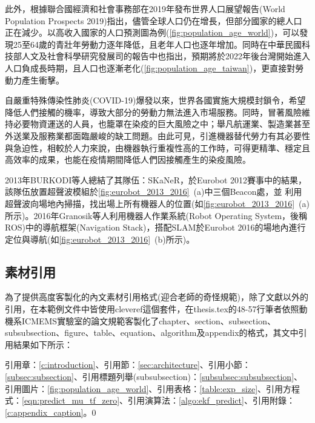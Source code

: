 此外，根據聯合國經濟和社會事務部在2019年發布世界人口展望報告(World Population Prospects 2019)\cite{nations2019world}指出，儘管全球人口仍在增長，但部分國家的總人口正在減少。以高收入國家的人口預測圖為例(\cref{fig:population_age_world})，可以發現25至64歲的青壯年勞動力逐年降低，且老年人口也逐年增加。同時在中華民國科技部人文及社會科學研究發展司的報告中也指出\cite{人文與社科簡訊_人口老化}，預期將於2022年後台灣開始進入人口負成長時期，且人口也逐漸老化(\cref{fig:population_age_taiwan})，更直接對勞動力產生衝擊。

自嚴重特殊傳染性肺炎(COVID-19)爆發以來，世界各國實施大規模封鎖令，希望降低人們接觸的機率，導致大部分的勞動力無法進入市場服務。同時，冒著風險維持必要物資運送的人員，也籠罩在染疫的巨大風險之中；舉凡航運業、製造業甚至外送業及服務業都面臨嚴峻的缺工問題。由此可見，引進機器替代勞力有其必要性與急迫性，相較於人力來說，由機器執行重複性高的工作時，可得更精準、穩定且高效率的成果，也能在疫情期間降低人們因接觸產生的染疫風險。

2013年BURKODI等人\cite{eurobot_ultrasound_2013}總結了其隊伍：SKaNeR，於Eurobot 2012賽事中的結果，該隊伍放置超聲波模組於\cref{fig:eurobot_2013_2016}~(a)中三個Beacon處，並
利用超聲波向場地內掃描，找出場上所有機器人的位置(如\cref{fig:eurobot_2013_2016}~(a)所示)。2016年Granosik等人\cite{eurobot_ros_2016}利用機器人作業系統(Robot Operating System，後稱ROS)\cite{ros_2009}中的導航框架(Navigation Stack)，搭配SLAM於Eurobot 2016的場地內進行定位與導航(如\cref{fig:eurobot_2013_2016}~(b)所示)。


\subsection{素材引用}

為了提供高度客製化的內文素材引用格式(迎合老師的奇怪規範)，除了文獻以外的引用，在本範例文件中皆使用cleveref這個套件，在thesis.tex的48-57行筆者依照動機系ICMEMS實驗室的論文規範客製化了chapter、section、subsection、subsubsection、figure、table、equation、algorithm及appendix的格式，其文中引用結果如下所示：

引用章：\cref{c:introduction}、引用節：\cref{sec:architecture}、引用小節：\cref{subsec:subsection}、引用標題列舉(subsubsection)：\cref{subsubsec:subsubsection}、引用圖片：\cref{fig:population_age_world}、引用表格：\cref{table:exp_size}、引用方程式：\cref{eqn:predict_mu_tf_zero}、引用演算法：\cref{algo:ekf_predict}、引用附錄：\cref{c:appendix_caption}。0